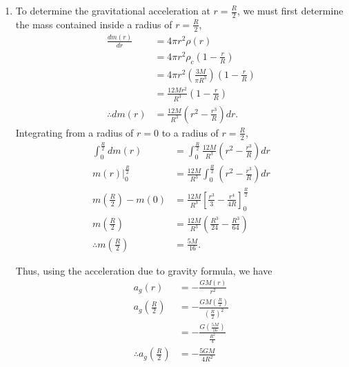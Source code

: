 \documentclass[a4paper,11pt]{article}
\newcommand{\ds}{\displaystyle}
\begin{document}
{{\begin{enumerate}[leftmargin=*]
\begin{enumerate}[label=\alph*)]
			\item To determine the gravitational acceleration at $\ds{r = \frac{R}{2}}$, we must first determine the mass contained inside a radius of $\ds{r = \frac{R}{2}}$, 
				\begin{align*}
					\frac{dm(r)}{dr} & = 4\pi r^2 \rho(r) \\
									 & = 4\pi r^2 \rho_c \left(1 - \frac{r}{R}\right) \\
									 & = 4\pi r^2 \left(\frac{3M}{\pi R^3}\right) \left(1 - \frac{r}{R}\right) \\
									 & = \frac{12Mr^2}{R^3}\left(1 - \frac{r}{R}\right) \\
				\therefore dm(r) & = \frac{12M}{R^3}\left(r^2 - \frac{r^3}{R}\right) dr.
				\end{align*}
				Integrating from a radius of $\ds{r=0}$ to a radius of $\ds{r=\frac{R}{2}}$,
				\begin{align*}
					\int_0^{\frac{R}{2}}dm(r) & = \int_0^{\frac{R}{2}}\frac{12M}{R^3}\left(r^2 - \frac{r^3}{R}\right)dr \\
					m(r)|_0^{\frac{R}{2}} & = \frac{12M}{R^3}\int_0^{\frac{R}{2}}\left(r^2 - \frac{r^3}{R}\right)dr \\
					m\left(\frac{R}{2}\right) - m(0) & = \frac{12M}{R^3}\left[\frac{r^3}{3} - \frac{r^4}{4R}\right]_0^{\frac{R}{2}} \\
					m\left(\frac{R}{2}\right) & = \frac{12M}{R^3}\left(\frac{R^3}{24} - \frac{R^3}{64}\right) \\
					\therefore m\left(\frac{R}{2}\right) & = \frac{5M}{16}.
				\end{align*}

				Thus, using the acceleration due to gravity formula, we have
				\begin{align*}
					a_g(r) & = -\frac{GM(r)}{r^2} \\
					a_g\left(\frac{R}{2}\right) & = -\frac{GM\left(\frac{R}{2}\right)}{\left(\frac{R}{2}\right)^2} \\
					& = -\frac{G\left(\frac{5M}{16}\right)}{\frac{R^2}{4}} \\
					\therefore a_g\left(\frac{R}{2}\right) & = -\frac{5GM}{4R^2} 
				\end{align*}
					

\end{enumerate}
\end{enumerate}}}
\end{document}
